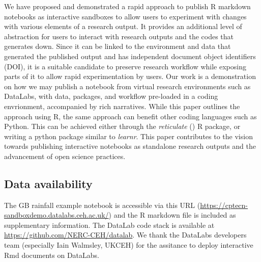 We have proposed and demonstrated a rapid approach to publish R markdown
notebooks as interactive sandboxes to allow users to experiment with
changes with various elements of a research output. It provides an
additional level of abstraction for users to interact with research
outputs and the codes that generates down. Since it can be linked to the
environment and data that generated the published output and has
independent document object identifiers (DOI), it is a suitable
candidate to preserve research workflow while exposing parts of it to
allow rapid experimentation by users. Our work is a demonstration on how
we may publish a notebook from virtual research environments such as
DataLabs, with data, packages, and workflow pre-loaded in a coding
envrionment, accompanied by rich narratives. While this paper outlines
the approach using R, the same approach can benefit other coding
languages such as Python. This can be achieved either through the
\emph{reticulate} (\citet{reticulate}) R package, or writing a python
package similar to \emph{learnr}. This paper contributes to the vision
towards publishing interactive notebooks as standalone research outputs
and the advancement of open science practices.

\hypertarget{data-availability}{%
\subsection{Data availability}\label{data-availability}}

The GB rainfall example notebook is accessible via this URL
(\url{https://cptecn-sandboxdemo.datalabs.ceh.ac.uk/}) and the R
markdown file is included as supplementary information. The DataLab code
stack is available at \url{https://github.com/NERC-CEH/datalab}. We
thank the DataLabs developers team (especially Iain Walmsley, UKCEH) for
the assitance to deploy interactive Rmd documents on DataLabs.



\address{%
Chak Hau Michael Tso\\
UK Centre for Ecology and Hydrology\\%
Lancaster Environment Centre\\ Lancaster LA1 4YQ, United Kingdom\\
%
%
\\\textit{ORCiD: \href{https://orcid.org/0000-0002-2415-0826}{0000-0002-2415-0826}}%
\\\href{mailto:mtso@ceh.ac.uk}{\nolinkurl{mtso@ceh.ac.uk}}
}

